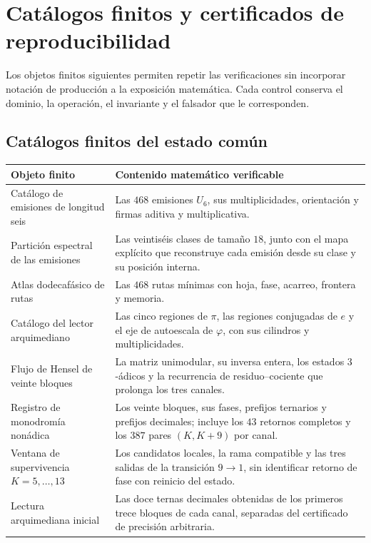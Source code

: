 \chapter{Catálogos finitos y certificados de reproducibilidad}
\label{app:datos-reproducibles}

Los objetos finitos siguientes permiten repetir las verificaciones sin
incorporar notación de producción a la exposición matemática. Cada control
conserva el dominio, la operación, el invariante y el falsador que le
corresponden.

\section{Catálogos finitos del estado común}

\begin{longtable}{@{}>{\raggedright\arraybackslash}p{}
  >{\raggedright\arraybackslash}p{}@{}}
\toprule
Objeto finito & Contenido matemático verificable\\
\midrule
\endhead
Catálogo de emisiones de longitud seis
& Las \(468\) emisiones \(U_6\), sus multiplicidades, orientación y firmas
aditiva y multiplicativa.\\
Partición espectral de las emisiones
& Las veintiséis clases de tamaño \(18\), junto con el mapa explícito que
reconstruye cada emisión desde su clase y su posición interna.\\
Atlas dodecafásico de rutas
& Las \(468\) rutas mínimas con hoja, fase, acarreo, frontera y memoria.\\
Catálogo del lector arquimediano
& Las cinco regiones de \(\pi\), las regiones conjugadas de \(e\) y el eje de
autoescala de \(\varphi\), con sus cilindros y multiplicidades.\\
Flujo de Hensel de veinte bloques
& La matriz unimodular, su inversa entera, los estados \(3\)-ádicos y la
recurrencia de residuo--cociente que prolonga los tres canales.\\
Registro de monodromía nonádica
& Los veinte bloques, sus fases, prefijos ternarios y prefijos decimales;
incluye los \(43\) retornos completos y los \(387\) pares \((K,K+9)\) por
canal.\\
Ventana de supervivencia \(K=5,\ldots,13\)
& Los candidatos locales, la rama compatible y las tres salidas de la
transición \(9\to1\), sin identificar retorno de fase con reinicio del estado.\\
Lectura arquimediana inicial
& Las doce ternas decimales obtenidas de los primeros trece bloques de cada
canal, separadas del certificado de precisión arbitraria.\\
\bottomrule
\end{longtable}

